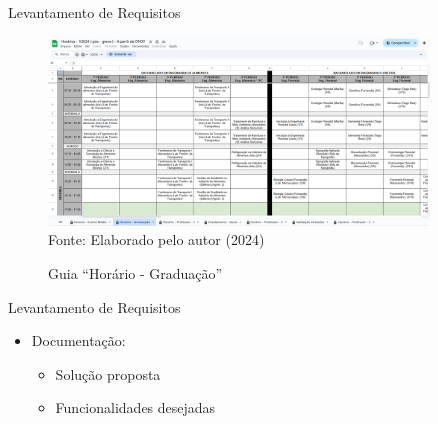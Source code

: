 \begin{frame}{Levantamento de Requisitos}
    \begin{figure}
        \centering
        \vspace{-0.5cm}
        \caption{Guia ``Horário - Graduação''}
        \vspace{-0.2cm}
        \includegraphics[width=0.9\textwidth]{figuras/plan-ant-2.png}
        \\ %
        \small Fonte: Elaborado pelo autor (2024)
    \end{figure}
\end{frame}

\begin{frame}{Levantamento de Requisitos}
    \begin{itemize}
        \item Documentação: \vspace{0.5cm}
              \begin{itemize}
                  \item Solução proposta \vspace{0.5cm}
                  \item Funcionalidades desejadas \vspace{0.5cm}
              \end{itemize}
    \end{itemize}
\end{frame}

